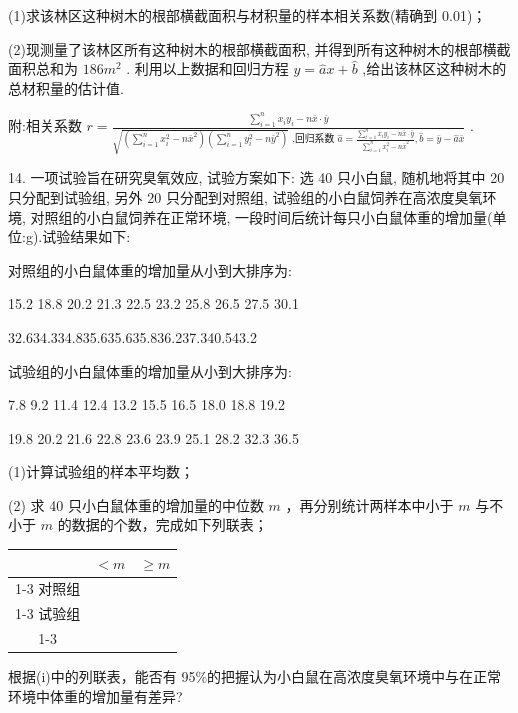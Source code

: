 (1)求该林区这种树木的根部横截面积与材积量的样本相关系数(精确到 0.01)；

(2)现测量了该林区所有这种树木的根部横截面积, 并得到所有这种树木的根部横截面积总和为 ${186}{{m}}^{2}$ . 利用以上数据和回归方程 $y = \widehat{a}x + \widehat{b}$ ,给出该林区这种树木的总材积量的估计值.

附:相关系数 $r = \frac{\mathop{\sum }\limits_{{i = 1}}^{n}{x}_{i}{y}_{i} - n\bar{x} \cdot  \bar{y}}{\sqrt{\left( {\mathop{\sum }\limits_{{i = 1}}^{n}{x}_{i}^{2} - n{\bar{x}}^{2}}\right) \left( {\mathop{\sum }\limits_{{i = 1}}^{n}{y}_{i}^{2} - n{\bar{y}}^{2}}\right) }\text{ ,回归系数 }\widehat{a} = \frac{\mathop{\sum }\limits_{{i = 1}}^{n}{x}_{i}{y}_{i} - n\bar{x} \cdot  \bar{y}}{\mathop{\sum }\limits_{{i = 1}}^{n}{x}_{i}^{2} - n{\bar{x}}^{2}},\widehat{b} = \bar{y} - \widehat{a}\bar{x}}$ .

14. 一项试验旨在研究臭氧效应, 试验方案如下: 选 40 只小白鼠, 随机地将其中 20 只分配到试验组, 另外 20 只分配到对照组, 试验组的小白鼠饲养在高浓度臭氧环境, 对照组的小白鼠饲养在正常环境, 一段时间后统计每只小白鼠体重的增加量(单位:g).试验结果如下:

对照组的小白鼠体重的增加量从小到大排序为:

15.2 18.8 20.2 21.3 22.5 23.2 25.8 26.5 27.5 30.1

32.634.334.835.635.635.836.237.340.543.2

试验组的小白鼠体重的增加量从小到大排序为:

7.8 9.2 11.4 12.4 13.2 15.5 16.5 18.0 18.8 19.2

19.8 20.2 21.6 22.8 23.6 23.9 25.1 28.2 32.3 36.5

(1)计算试验组的样本平均数；

(2)   求 40 只小白鼠体重的增加量的中位数 $m$ ，再分别统计两样本中小于 $m$ 与不小于 $m$ 的数据的个数，完成如下列联表；

\begin{center}
\begin{tabular}{|c|c|c|}
\hline
\phantom{X} & $< m$ & $\geq  m$ \\
\cline{1-3}
对照组 & \phantom{X} & \phantom{X} \\
\cline{1-3}
试验组 & \phantom{X} & \phantom{X} \\
\cline{1-3}
\hline
\end{tabular}
\end{center}

  根据(i)中的列联表，能否有 95\%的把握认为小白鼠在高浓度臭氧环境中与在正常环境中体重的增加量有差异?

